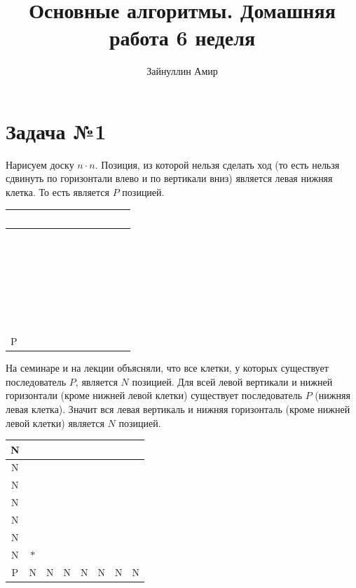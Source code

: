 \documentclass{article}
\begin{document}
\title{\textbf{Основные алгоритмы. Домашняя работа 6 неделя}}


\author{Зайнуллин Амир}
\maketitle

\section*{Задача №1}

Нарисуем доску $n \cdot n$. Позиция, из которой нельзя сделать ход (то есть нельзя сдвинуть по горизонтали влево и по вертикали вниз) является левая нижняя клетка. То есть является $P$ позицией.

\begin{table}[!ht]
    \centering
    \begin{tabular}{|c|c|c|c|c|c|c|c|}
    \hline
        ~ & ~ & ~ & ~ & ~ & ~ & ~ & ~ \\ \hline
        ~ & ~ & ~ & ~ & ~ & ~ & ~ & ~ \\ \hline
        ~ & ~ & ~ & ~ & ~ & ~ & ~ & ~ \\ \hline
        ~ & ~ & ~ & ~ & ~ & ~ & ~ & ~ \\ \hline
        ~ & ~ & ~ & ~ & ~ & ~ & ~ & ~ \\ \hline
        ~ & ~ & ~ & ~ & ~ & ~ & ~ & ~ \\ \hline
        ~ & ~ & ~ & ~ & ~ & ~ & ~ & ~ \\ \hline
        P & ~ & ~ & ~ & ~ & ~ & ~ & ~ \\ \hline
    \end{tabular}
\end{table}

На семинаре и на лекции объясняли, что все клетки, у которых существует последователь $P$, является $N$ позицией. Для всей левой вертикали и нижней горизонтали (кроме нижней левой клетки) существует последователь $P$ (нижняя левая клетка). Значит вся левая вертикаль и нижняя горизонталь (кроме нижней левой клетки) является $N$ позицией.

\begin{table}[!ht]
    \centering
    \begin{tabular}{|c|c|c|c|c|c|c|c|}
    \hline
        N & ~ & ~ & ~ & ~ & ~ & ~ & ~ \\ \hline
        N & ~ & ~ & ~ & ~ & ~ & ~ & ~ \\ \hline
        N & ~ & ~ & ~ & ~ & ~ & ~ & ~ \\ \hline
        N & ~ & ~ & ~ & ~ & ~ & ~ & ~ \\ \hline
        N & ~ & ~ & ~ & ~ & ~ & ~ & ~ \\ \hline
        N & ~ & ~ & ~ & ~ & ~ & ~ & ~ \\ \hline
        N & $*$ & ~ & ~ & ~ & ~ & ~ & ~ \\ \hline
        P & N & N & N & N & N & N & N \\ \hline
    \end{tabular}
\end{table}
\end{document}
